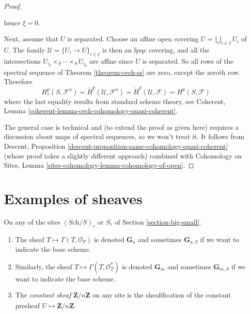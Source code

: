 \begin{proof}
\begin{enumerate}
hence $\xi = 0$.
\end{enumerate}
Next, assume that $U$ is separated. Choose an affine open covering
$U = \bigcup_{i \in I} U_i$ of $U$. The family
$\mathcal{U} = \{U_i \to U\}_{i \in I}$ is then an fpqc covering,
and all the intersections
$U_{i_0} \times_S \cdots \times_S U_{i_p}$ are affine
since $U$ is separated. So all rows of the spectral sequence of
Theorem \ref{theorem-cech-ss}
are zero, except the zeroth row. Therefore
$$
H^p_\tau(S, \mathcal{F}^a) =
\check H^p(\mathcal{U}, \mathcal{F}^a) =
\check H^p(\mathcal{U}, \mathcal{F}) = H^p(S, \mathcal{F})
$$
where the last equality results from standard scheme theory, see
Coherent, Lemma \ref{coherent-lemma-cech-cohomology-quasi-coherent}.

\medskip\noindent
The general case is technical and (to extend the proof as given here)
requires a discussion about maps of spectral sequences, so we won't treat it.
It follows from
Descent, Proposition \ref{descent-proposition-same-cohomology-quasi-coherent}
(whose proof takes a slightly different approach) combined with
Cohomology on Sites, Lemma \ref{sites-cohomology-lemma-cohomology-of-open}.
\end{proof}





\section{Examples of sheaves}
\label{section-examples-sheaves}

\begin{definition}
\label{definition-additive-sheaf}
On any of the sites $(\textit{Sch}/S)_\tau$ or $S_\tau$ of
Section \ref{section-big-small}.
\begin{enumerate}
\item The sheaf $T \mapsto \Gamma(T, \mathcal{O}_T)$ is denoted $\mathbf{G}_a$
and sometimes $\mathbf{G}_{a, S}$ if we want to indicate the base scheme.
\item Similarly, the sheaf
$T \mapsto \Gamma(T, \mathcal{O}^*_T)$ is denoted $\mathbf{G}_m$ and
sometimes $\mathbf{G}_{m, S}$ if we want to indicate the base scheme.
\item The {\it constant sheaf} $\underline{\mathbf{Z}/n\mathbf{Z}}$ on any
site is the sheafification of the constant presheaf
$U \mapsto \mathbf{Z}/n\mathbf{Z}$.
\end{enumerate}
\end{definition}

